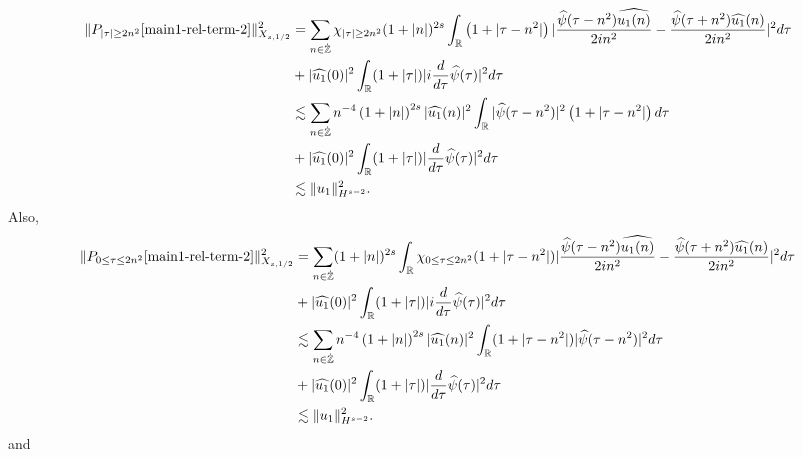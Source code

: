 \documentclass[12pt,reqno]{amsart}
\numberwithin{equation}{section}  %
\renewcommand{\cref}{\Cref}
\newcommand{\rr}{\mathbb{R}}
\newcommand{\zz}{\mathbb{Z}}
\newcommand{\zzdot}{\dot{\zz}}
\newcommand{\wh}{\widehat}
\begin{document}
\begin{equation*}
  \begin{split}
    \| P_{| \tau | \ge 2n^{2}}\cref{main1-rel-term-2} \|_{X_{s,1/2}}^{2} 
    & = \sum_{n \in \zzdot} \chi_{| \tau | \ge 2n^{2}}(1 + |n|)^{2s} \int_{\rr}\left( 1 + | \tau
    -n^{2} | \right) | \frac{\wh{\psi}(\tau - n^{2})\wh{u_{1}(n)}}{2i
    n^{2}} -
    \frac{\wh{\psi}(\tau + n^{2})\wh{u_{1}}(n)}{2i n^{2}} |^{2} d \tau
    \\
    & + |\wh{u_{1}}(0)|^{2} \int_{\rr} (1 + | \tau |) | i \frac{d}{d \tau}
    \wh{\psi}(\tau)|^{2} d \tau
    \\
    & \lesssim \sum_{n \in \dot{\zz}} n^{-4} \left( 1 + |n| \right)^{2s} | \wh{u_{1}}(n)
    |^{2} \int_{\rr} | \wh{\psi}(\tau - n^{2}) |^{2}\left( 1 + |  \tau -
    n^{2} | \right) d \tau
    \\
    & + |\wh{u_{1}}(0)|^{2} \int_{\rr} (1 + | \tau |) |\frac{d}{d \tau}
    \wh{\psi}(\tau)|^2 d \tau
    \\
    & \lesssim \| u_{1} \|_{H^{s-2}}^{2}.
\end{split}
\end{equation*}
%
Also,
\begin{equation*}
  \begin{split}
    \| P_{0 \le  \tau  \le  2n^{2}}\cref{main1-rel-term-2} \|_{X_{s,1/2}}^{2} 
    & = \sum_{n \in \zzdot} (1 + |n|)^{2s} \int_{\rr}  \chi_{0 \le \tau  \le 2n^{2}}(1 + | \tau - n^{2} |) | \frac{\wh{\psi}(\tau - n^{2})\wh{u_{1}(n)}}{2i
    n^{2}} -
    \frac{\wh{\psi}(\tau + n^{2})\wh{u_{1}}(n)}{2i n^{2}} |^{2} d \tau
    \\
    & + |\wh{u_{1}}(0)|^{2} \int_{\rr} (1 + | \tau|) | i \frac{d}{d \tau}
    \wh{\psi}(\tau)|^{2} d \tau
    \\
    & \lesssim \sum_{n \in \dot{\zz}} n^{-4} \left( 1 + |n| \right)^{2s} | \wh{u_{1}}(n)
    |^{2} \int_{\rr}  (1 + | \tau - n^{2} |)| \wh{\psi}(\tau - n^{2}) |^{2} d \tau
    \\
    & + |\wh{u_{1}}(0)|^{2} \int_{\rr} (1 + | \tau |) |\frac{d}{d \tau}
    \wh{\psi}(\tau)|^2 d \tau
    \\
    & \lesssim \| u_{1} \|_{H^{s-2}}^{2}.
\end{split}
\end{equation*}
%
and
\end{document}
